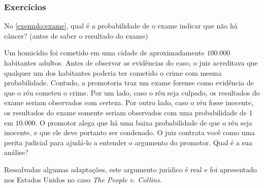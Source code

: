 \subsubsection*{Exercícios}

\begin{exercise}
 No \cref{exemplo:exame}, qual é a 
 probabilidade de o exame indicar que não há câncer? 
 (antes de saber o resultado do exame)
\end{exercise}


\begin{exercise}
 Um homicídio foi cometido em uma cidade de
 aproximadamente $100.000$ habitantes adultos.
 Antes de observar as evidências do caso, 
 o juiz acreditava que qualquer um dos habitantes
 poderia ter cometido o crime com mesma probabilidade.
 Contudo, a promotoria traz um exame forense como
 evidência de que o réu cometeu o crime.
 Por um lado, caso o réu seja culpado, 
 os resultados do exame seriam 
 observados com certeza.
 Por outro lado, caso o réu fosse inocente, 
 os resultados do exame somente seriam 
 observados com uma probabilidade de 
 $1$ em $10.000$.
 O promotor alega que há
uma baixa probabilidade de que
o réu seja inocente, e que ele deve portanto ser condenado.
 O juiz contrata você como uma
 perita judicial para ajudá-lo a 
 entender o argumento do promotor.
 Qual é a sua análise?
 
 Ressalvadas algumas adaptações, 
 este argumento jurídico é real e
 foi apresentado nos Estados Unidos no
 caso \emph{The People v. Collins}.
\end{exercise}

